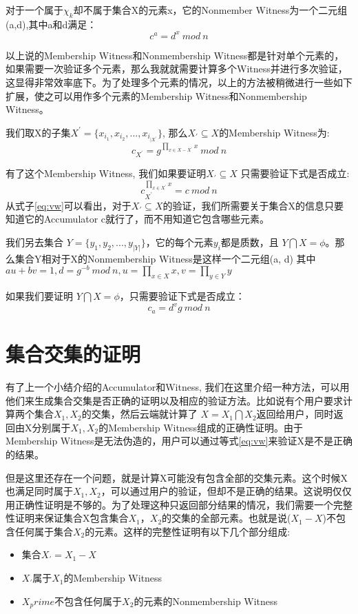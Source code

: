 对于一个属于$\chi_k$却不属于集合X的元素x，它的Nonmember Witness为一个二元组(a,d)\cite{li2007universal},其中a和d满足：
\begin{equation} c^a = d^x\ mod\ n\end{equation}

以上说的Membership Witness和Nonmembership Witness都是针对单个元素的，如果需要一次验证多个元素，那么我就就需要计算多个Witness并进行多次验证，这显得非常效率底下。为了处理多个元素的情况，以上的方法被稍微进行一些如下扩展，使之可以用作多个元素的Membership Witness和Nonmembership Witness。

我们取X的子集$X^{\prime} = \{x_{i_1}, x_{i_2}, ... , x_{i_{|X^\prime}}\}$, 那么$X_\prime \subseteq X$的Membership Witness为:
\begin{equation} \label{eq:w} c_{X^\prime} = g^{\prod_{x \in X - X^\prime} x}\ mod\ n \end{equation}

有了这个Membership Witness, 我们如果要证明$X_\prime \subseteq X$ 只需要验证下式是否成立:
\begin{equation} \label{eq:vw} c_{X^\prime}^{\prod_{x \in X^\prime} x} = c\ mod\ n\end{equation}
从式子\ref{eq:vw}可以看出，对于$X_\prime \subseteq X$的验证，我们所需要关于集合X的信息只要知道它的Accumulator c就行了，而不用知道它包含哪些元素。

我们另去集合 $Y = \{y_1, y_2, ... , y_{|Y|}\}$，它的每个元素$y_i$都是质数，且 $Y \bigcap X = \phi$。那么集合Y相对于X的Nonmembership Witness是这样一个二元组(a, d) 其中
$au + bv = 1, d = g^{-b}\ mod\ n, u = \prod_{x \in X} x, v = \prod_{y \in Y} y$

如果我们要证明 $Y \bigcap X = \phi$，只需要验证下式是否成立：
\begin{equation} \label{eq:vnw} c_a = d^v g\ mod\ n \end{equation}

\section{集合交集的证明}
有了上一个小结介绍的Accumulator和Witness, 我们在这里介绍一种方法，可以用他们来生成集合交集是否正确的证明以及相应的验证方法。比如说有个用户要求计算两个集合$X_1, X_2$的交集，然后云端就计算了 $X = X_1 \bigcap X_2$返回给用户，同时返回由X分别属于$X_1, X_2$的Membership Witness组成的正确性证明。由于Membership Witness是无法伪造的，用户可以通过等式\ref{eq:vw}来验证X是不是正确的结果。

但是这里还存在一个问题，就是计算X可能没有包含全部的交集元素。这个时候X也满足同时属于$X_1, X_2$，可以通过用户的验证，但却不是正确的结果。这说明仅仅用正确性证明是不够的。为了处理这种只返回部分结果的情况，我们需要一个完整性证明来保证集合X包含集合$X_1$，$X_2$的交集的全部元素。也就是说($X_1 - X$)不包含任何属于集合$X_2$的元素。这样的完整性证明有以下几个部分组成:
\begin{itemize}
\item 集合$X_\prime = X_1 - X$
\item $X_\prime$属于$X_1$的Membership Witness
\item $X_prime$不包含任何属于$X_2$的元素的Nonmembership Witness
\end{itemize}

